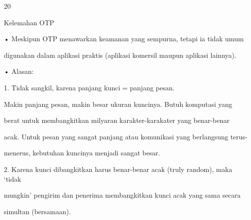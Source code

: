 \documentclass{article}
\begin{document}

20

Kelemahan OTP

• Meskipun OTP menawarkan keamanan yang sempurna, tetapi ia tidak umum 

digunakan dalam aplikasi praktis (aplikasi komersil maupun aplikasi lainnya).

• Alasan:

 1. Tidak sangkil, karena panjang kunci =  panjang pesan. 

     Makin panjang pesan, makin besar ukuran kuncinya. Butuh komputasi yang

       berat untuk membangkitkan milyaran  karakter-karakater yang benar-benar

       acak. Untuk pesan yang sangat panjang atau komunikasi yang berlangsung terus-

menerus, kebutuhan kuncinya menjadi sangat besar.

   2. Karena kunci dibangkitkan harus benar-benar acak (truly random), maka ‘tidak 

mungkin’  pengirim dan  penerima membangkitkan kunci acak yang sama secara 

simultan (bersamaan).
\end{document}
